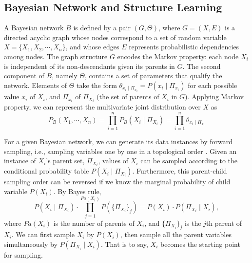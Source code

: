 \subsection{Bayesian Network and Structure Learning}
\label{BN_basic}
A Bayesian network $B$ is defined by a pair $(G,\Theta)$, where $G = (X,E)$ is a directed acyclic graph whose nodes correspond to a set of random variable $X = \{  X_1, X_2, \cdots, X_n \}$, and whose edges $E$ represents probabilistic dependencies among nodes. The graph structure $G$ encodes the Markov property: each node $X_i$ is independent of its non-descendants given its parents in $G$. The second component of $B$, namely $\Theta$, contains a set of parameters that qualify the network. Elements of $\Theta$ take the form $\theta_{x_i \mid \Pi_{x_i}} = P(x_i \mid \Pi_{x_i})$ for each possible value $x_i$ of $X_i$, and $\Pi_{x_i}$ of $\Pi_{X_i}$ (the set of parents of $X_i$ in $G$). Applying Markov property, we can represent the multivariate joint distribution over $X$ as
\begin{equation}
P_B (X_1 , \cdots, X_n) = \prod_{i=1}^{n} P_B (X_i \mid \Pi_{X_i}) = \prod_{i=1}^{n} \theta_{x_i \mid \Pi_{x_i}}
\end{equation}

For a given Bayesian network, we can generate its data instances by forward sampling, i.e., sampling variables one by one in a topological order \citep[see][chap.~22]{algo_2009}. Given an instance of $X_i$'s parent set, $\Pi_{X_i}$, values of $X_i$ can be sampled according to the conditional probability table $P(X_i \mid \Pi_{X_i})$. Furthermore, this parent-child sampling order can be reversed if we know the marginal probability of child variable $P(X_i)$. By Bayes rule,
\begin{equation}
P(X_i \mid \Pi_{X_i}) \cdot \prod_{j = 1}^{ Pa( X_i)} P( \{ \Pi_{X_i} \}_j) = P(X_i) \cdot P(\Pi_{X_i} \mid X_i),
\end{equation}
where $Pa( X_i)$ is the number of parents of $X_i$, and $\{ \Pi_{X_i} \}_j$ is the $j$th parent of $X_i$. We can first sample $X_i$ by $P(X_i)$, then sample all the parent variables simultaneously by $P(\Pi_{X_i} \mid X_i)$. That is to say, $X_i$ becomes the starting point for sampling.


